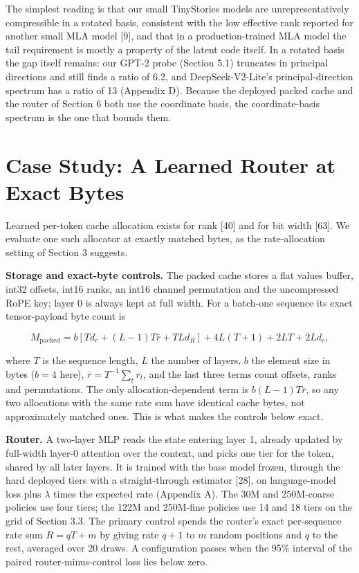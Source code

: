 \documentclass[10pt]{article}
\begin{document}
The simplest reading is that our small TinyStories models are unrepresentatively compressible in a rotated basis, consistent with the low effective rank reported for another small MLA model [9], and that in a production-trained MLA model the tail requirement is mostly a property of the latent code itself. In a rotated basis the gap itself remains: our GPT-2 probe (Section 5.1) truncates in principal directions and still finds a ratio of 6.2, and DeepSeek-V2-Lite's principal-direction spectrum has a ratio of 13 (Appendix D). Because the deployed packed cache and the router of Section 6 both use the coordinate basis, the coordinate-basis spectrum is the one that bounds them.

\section{Case Study: A Learned Router at Exact Bytes}

Learned per-token cache allocation exists for rank [40] and for bit width [63]. We evaluate one such allocator at exactly matched bytes, as the rate-allocation setting of Section 3 suggests.

\textbf{Storage and exact-byte controls.} The packed cache stores a flat values buffer, int32 offsets, int16 ranks, an int16 channel permutation and the uncompressed RoPE key; layer 0 is always kept at full width. For a batch-one sequence its exact tensor-payload byte count is

\[M_{\text{packed}}=
b\left[Td_c+(L-1)T\bar r+TLd_R\right]
+4L(T+1)+2LT+2Ld_c,\]

where $T$ is the sequence length, $L$ the number of layers, $b$ the element size in bytes ($b=4$ here), $\bar r=T^{-1}\sum_t r_t$, and the last three terms count offsets, ranks and permutations. The only allocation-dependent term is $b(L-1)T\bar r$, so any two allocations with the same rate sum have identical cache bytes, not approximately matched ones. This is what makes the controls below exact.

\textbf{Router.} A two-layer MLP reads the state entering layer 1, already updated by full-width layer-0 attention over the context, and picks one tier for the token, shared by all later layers. It is trained with the base model frozen, through the hard deployed tiers with a straight-through estimator [28], on language-model loss plus $\lambda$ times the expected rate (Appendix A). The 30M and 250M-coarse policies use four tiers; the 122M and 250M-fine policies use 14 and 18 tiers on the grid of Section 3.3. The primary control spends the router's exact per-sequence rate sum $R=qT+m$ by giving rate $q+1$ to $m$ random positions and $q$ to the rest, averaged over 20 draws. A configuration passes when the 95\% interval of the paired router-minus-control loss lies below zero.
\end{document}
